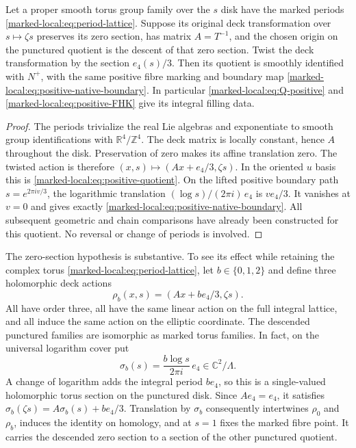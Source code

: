 \begin{proposition}\label{marked-local:prop:marked-comparison}
Let a proper smooth torus group family over the $s$ disk have
the marked periods \eqref{marked-local:eq:period-lattice}. Suppose its original
deck transformation over $s\mapsto\zeta s$ preserves its zero
section, has matrix $A=T^{-1}$, and the chosen origin on the
punctured quotient is the descent of that zero section. Twist the
deck transformation by the section $e_4(s)/3$. Then its quotient
is smoothly identified with $N^+$, with the same positive fibre
marking and boundary map \eqref{marked-local:eq:positive-native-boundary}.
In particular \eqref{marked-local:eq:Q-positive} and
\eqref{marked-local:eq:positive-FHK} give its integral filling data.
\end{proposition}
\begin{proof}
The periods trivialize the real Lie algebras and exponentiate to
smooth group identifications with $\mathbb R^4/\mathbb Z^4$.
The deck matrix is locally constant, hence $A$ throughout the disk.
Preservation of zero makes its affine translation zero. The twisted
action is therefore $(x,s)\mapsto(Ax+e_4/3,\zeta s)$.
In the oriented $u$ basis this is \eqref{marked-local:eq:positive-quotient}.
On the lifted positive boundary path $s=e^{2\pi iv/3}$,
the logarithmic translation
$(\log s)/(2\pi i)\,e_4$ is $ve_4/3$. It vanishes at $v=0$
and gives exactly \eqref{marked-local:eq:positive-native-boundary}.
All subsequent geometric and chain comparisons have already been
constructed for this quotient. No reversal or change of periods is
involved.
\end{proof}

The zero-section hypothesis is substantive. To see its effect while
retaining the complex torus \eqref{marked-local:eq:period-lattice}, let
$b\in\{0,1,2\}$ and define three holomorphic deck actions
\begin{equation}\label{marked-local:eq:affine-ambiguity}
 \rho_b(x,s)=(Ax+be_4/3,\zeta s).
\end{equation}
All have order three, all have the same linear action on the full
integral lattice, and all induce the same action on the elliptic
coordinate. The descended punctured families are isomorphic as
marked torus families. In fact, on the universal logarithm cover put
\[
 \sigma_b(s)=\frac{b\log s}{2\pi i}\,e_4\in\mathbb C^2/\Lambda.
\]
A change of logarithm adds the integral period $be_4$, so this is a
single-valued holomorphic torus section on the punctured disk.
Since $Ae_4=e_4$, it satisfies
$\sigma_b(\zeta s)=A\sigma_b(s)+be_4/3$.
Translation by $\sigma_b$ consequently intertwines $\rho_0$ and
$\rho_b$, induces the identity on homology, and at $s=1$ fixes the
marked fibre point. It carries the descended zero section to a
section of the other punctured quotient.

